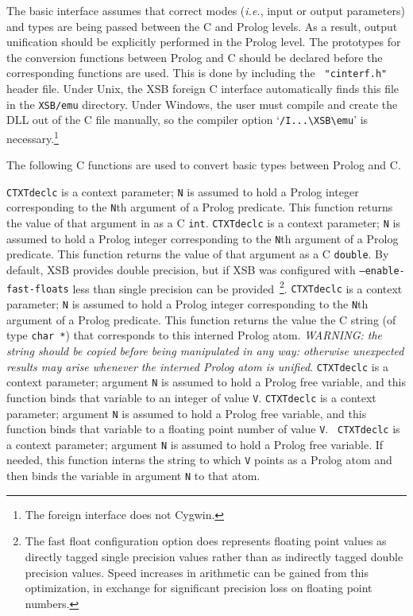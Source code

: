 The basic interface assumes that correct modes ({\it i.e.}, input or
output parameters) and types are being passed between the C and Prolog
levels.  As a result, output unification should be explicitly
performed in the Prolog level.  The prototypes for the conversion
functions between Prolog and C should be declared before the
corresponding functions are used.  This is done by including the {\tt
  "cinterf.h"} header file.  Under Unix, the XSB foreign C interface
automatically finds this file in the {\tt XSB/emu} directory. Under
Windows, the user must compile and create the DLL
out of the C file manually, so the compiler option
`\verb|/I...\XSB\emu|' is necessary.\footnote{The foreign interface does not Cygwin.}

The following C functions are used to convert basic types between
Prolog and C.
\begin{description}
 {\tt CTXTdeclc} is a context
parameter; {\tt N} is assumed to hold a Prolog integer corresponding
to the {\tt N}th argument of a Prolog predicate.  This function
returns the value of that argument in as a C {\tt int}.
%
 {\tt CTXTdeclc} is a
context parameter; {\tt N} is assumed to hold a Prolog integer
corresponding to the {\tt N}th argument of a Prolog predicate.  This
function returns the value of that argument as a C {\tt double}.  By
default, XSB provides double precision, but if XSB was configured with
{\tt --enable-fast-floats} less than single precision can be
provided~\footnote{The fast float configuration option does represents
  floating point values as directly tagged single precision values
  rather than as indirectly tagged double precision values. Speed
  increases in arithmetic can be gained from this optimization, in
  exchange for significant precision loss on floating point numbers.}.
%
 {\tt CTXTdeclc} is a
context parameter; {\tt N} is assumed to hold a Prolog integer
corresponding to the {\tt N}th argument of a Prolog predicate.  This
function returns the value the C string (of type {\tt char *}) that
corresponds to this interned Prolog atom.  {\em WARNING: the string
  should be copied before being manipulated in any way: otherwise
  unexpected results may arise whenever the interned Prolog atom is
  unified}.
%
 {\tt CTXTdeclc} is a
context parameter; argument {\tt N} is assumed to hold a Prolog free
variable, and this function binds that variable to an integer of value
{\tt V}.
%
 {\tt CTXTdeclc} is a
context parameter; argument {\tt N} is assumed to hold a Prolog free
variable, and this function binds that variable to a floating point
number of value {\tt V}.
%
 {\tt
  CTXTdeclc} is a context parameter; argument {\tt N} is assumed to
hold a Prolog free variable.  If needed, this function interns the
string to which {\tt V} points as a Prolog atom and then binds the
variable in argument {\tt N} to that atom.
\end{description}


